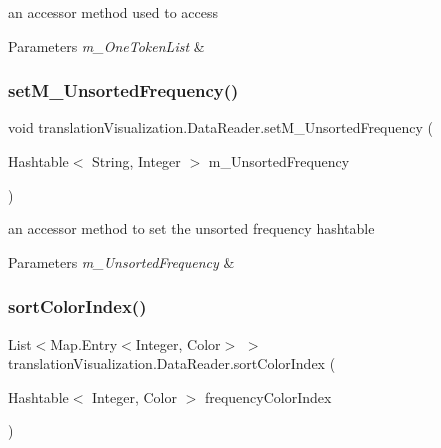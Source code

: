 an accessor method used to access 
\begin{DoxyParams}{Parameters}
{\em m\+\_\+\+One\+Token\+List} & \\
\hline
\end{DoxyParams}
\mbox{\label{classtranslation_visualization_1_1_data_reader_ab49397171d2134b9caedb30a34d747c0}} 
\subsubsection{\texorpdfstring{set\+M\+\_\+\+Unsorted\+Frequency()}{setM\_UnsortedFrequency()}}
{\footnotesize\ttfamily void translation\+Visualization.\+Data\+Reader.\+set\+M\+\_\+\+Unsorted\+Frequency (\begin{DoxyParamCaption}\item[{Hashtable$<$ String, Integer $>$}]{m\+\_\+\+Unsorted\+Frequency }\end{DoxyParamCaption})\hspace{0.3cm}{\ttfamily [inline]}}

an accessor method to set the unsorted frequency hashtable 
\begin{DoxyParams}{Parameters}
{\em m\+\_\+\+Unsorted\+Frequency} & \\
\hline
\end{DoxyParams}
\mbox{\label{classtranslation_visualization_1_1_data_reader_aa06a2341e6c975569440d90cec7b30e9}} 
\subsubsection{\texorpdfstring{sort\+Color\+Index()}{sortColorIndex()}}
{\footnotesize\ttfamily List$<$Map.\+Entry$<$Integer, Color$>$ $>$ translation\+Visualization.\+Data\+Reader.\+sort\+Color\+Index (\begin{DoxyParamCaption}\item[{Hashtable$<$ Integer, Color $>$}]{frequency\+Color\+Index }\end{DoxyParamCaption})\hspace{0.3cm}{\ttfamily [inline]}}

